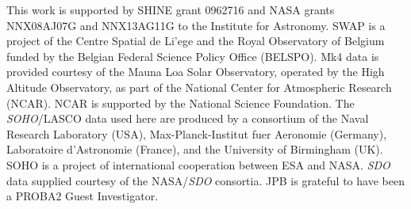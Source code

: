 \documentclass[namedreferences]{solarphysics}
\begin{document}
\begin{article}
{}




%



%
  

%



%
 \begin{acks}
 
This work is supported by SHINE grant 0962716 and NASA grants NNX08AJ07G and NNX13AG11G to the Institute for Astronomy.
SWAP is a project of the Centre Spatial de Li'ege and the Royal Observatory of Belgium funded by the Belgian Federal Science Policy Office (BELSPO).
Mk4 data is provided courtesy of the Mauna Loa Solar Observatory, operated by the High Altitude Observatory, as part of the National Center for Atmospheric Research (NCAR). NCAR is supported by the National Science Foundation.
The \emph{SOHO}/LASCO data used here are produced by a consortium of the Naval Research Laboratory (USA), Max-Planck-Institut fuer Aeronomie (Germany), Laboratoire d'Astronomie (France), and the University of Birmingham (UK). SOHO is a project of international cooperation between ESA and NASA.
\emph{SDO} data supplied courtesy of the NASA/\emph{SDO} consortia. JPB is grateful to have been a PROBA2 Guest Investigator.

 \end{acks}


%
%
 
   
%
%
%   
%  

\end{article} 
\end{document}
